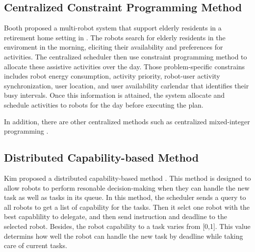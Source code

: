 \subsection{Centralized Constraint Programming Method}
\label{sec:constraint_programming}

Booth proposed a multi-robot system that support elderly residents in a retirement home setting in  \cite{retire2017}. The robots search for elderly residents in the enviroment in the morning, eliciting their availability and preferences for activities. The centralized scheduler then use constraint programming method to allocate these assistive activities over the day. Those problem-specific constrains includes robot energy consumption, activity priority, robot-user activity synchronization, user location, and user availability carlendar that identifies their busy intervals. Once this information is attained, the system allocate and schedule activities to robots for the day before executing the plan.

In addition, there are other centralized methods such as centralized mixed-integer programming \cite{Korsah13}.

\subsection{Distributed Capability-based Method}
\label{sec:distributed_capability_based_method}
Kim proposed a distributed capability-based method \cite{KIM2016386}. This method is designed to allow robots to perform resonable decision-making when they can handle the new task as well as tasks in its queue.
In this method, the scheduler sends a query to all robots to get a list of capability for the tasks. Then it selct one robot with the best capablility to delegate, and then send instruction and deadline to the selected robot. Besides, the robot capability to a task varies from [0,1]. This value determins how well the robot can handle the new task by deadline while taking care of current tasks.


